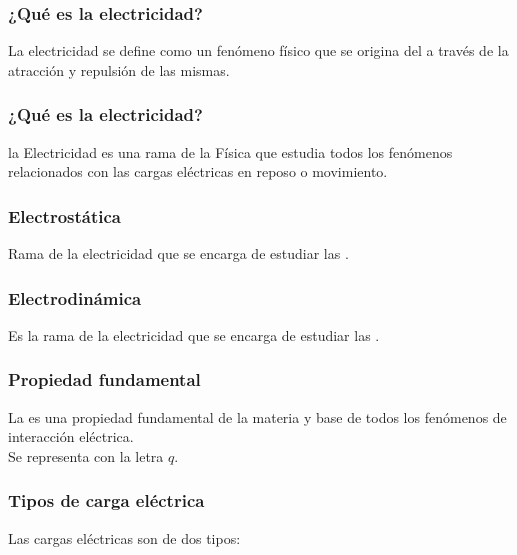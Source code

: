 \documentclass[14pt]{beamer}
\begin{document}
\begin{frame}
\frametitle{¿Qué es la electricidad?}
La electricidad se define como un fenómeno físico que se origina del  a través de la atracción y repulsión de las mismas.
\end{frame}
\begin{frame}
\frametitle{¿Qué es la electricidad?}
la Electricidad es una rama de la Física que estudia todos los fenómenos relacionados con las cargas eléctricas en reposo o movimiento.
\end{frame}
\begin{frame}
\frametitle{Electrostática}
Rama de la electricidad que se encarga de estudiar las .
\end{frame}
\begin{frame}
\frametitle{Electrodinámica}
Es la rama de la electricidad que se encarga de estudiar las .
\end{frame}
\begin{frame}
\frametitle{Propiedad fundamental}
La  es una propiedad fundamental de la materia y base de todos los fenómenos de interacción eléctrica.
\\
\bigskip
\pause
Se representa con la letra $q$.
\end{frame}
\begin{frame}
\frametitle{Tipos de carga eléctrica}
Las cargas eléctricas son de dos tipos:
\pause
\begin{figure}
    \centering
\end{figure}
\end{frame}
\end{document}
